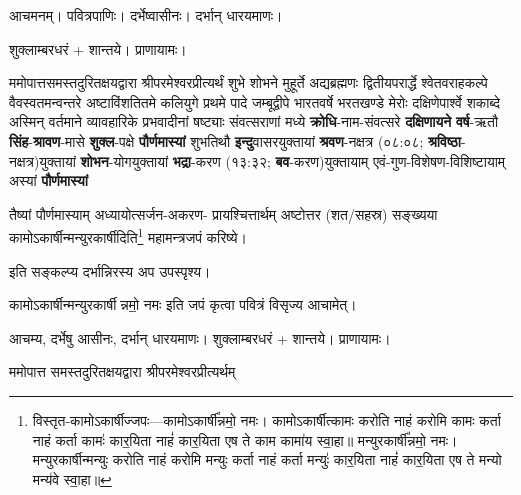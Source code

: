 
\setlength{\parindent}{0pt}

\newcommand{\sep}{\hspace{-0.5ex}{\small$\circ$}\hspace{0.5ex}}
\newcommand{\yutithyadi}{\textbf{क्रोधि}-नाम-संवत्सरे    \textbf{दक्षिणायने} \textbf{वर्ष}-ऋतौ   \textbf{सिंह}-\textbf{श्रावण}-मासे  \textbf{शुक्ल}-पक्षे    \textbf{पौर्णमास्यां} शुभतिथौ   \textbf{इन्दु}\-वासर\-युक्तायां \textbf{श्रवण}-नक्षत्र (०८:०८; \textbf{श्रविष्ठा}-नक्षत्र)\-युक्तायां   \textbf{शोभन}-योग\-युक्तायां    \textbf{भद्रा}-करण (१३:३२; \textbf{बव}-करण)\-युक्तायाम् एवं-गुण-विशेषण-विशिष्टायाम्     अस्यां \textbf{पौर्णमास्यां}}
\newcommand{\instruct}[2]{#1}
\begingroup


आचमनम्। पवित्रपाणिः। दर्भेष्वासीनः। दर्भान् धारयमाणः।

शुक्लाम्बरधरं + शान्तये। प्राणायामः।

ममोपात्तसमस्तदुरितक्षयद्वारा श्रीपरमेश्वरप्रीत्यर्थं शुभे शोभने मुहूर्ते अद्यब्रह्मणः
द्वितीयपरार्द्धे श्वेतवराहकल्पे वैवस्वतमन्वन्तरे अष्टाविंशतितमे कलियुगे प्रथमे पादे
जम्बूद्वीपे भारतवर्षे भरतखण्डे मेरोः दक्षिणेपार्श्वे शकाब्दे अस्मिन् वर्तमाने व्यावहारिके
 प्रभवादीनां षष्ट्याः संवत्सराणां मध्ये
\yutithyadi

तैष्यां पौर्णमास्याम् अध्यायोत्सर्जन-अकरण- प्रायश्चित्तार्थम् अष्टोत्तर (शत/सहस्र) सङ्ख्यया कामोऽकार्षीन्मन्युरकार्षीदिति\footnote{विस्तृत-कामोऽकार्षीज्जपः---कामोऽकार्\mbox{}षी᳚न्नमो॒ नमः। 
 कामोऽकार्\mbox{}षीत्कामः करोति नाहं करोमि कामः कर्ता नाहं कर्ता कामः॑ कार॒यिता नाहं॑ कार॒यिता एष ते काम कामा॑य स्वा॒हा॥ मन्युरकार्\mbox{}षी᳚न्नमो॒ नमः। 
मन्युरकार्\mbox{}षीन्मन्युः करोति नाहं करोमि मन्युः कर्ता नाहं कर्ता मन्युः॑ कार॒यिता नाहं॑ कार॒यिता एष ते मन्यो मन्य॑वे स्वा॒हा॥} महा\-मन्त्र\-जपं करिष्ये।

\instruct{इति सङ्कल्प्य दर्भान्निरस्य अप उपस्पृश्य।}{என்று ஸங்கல்பம் செய்து கொண்டு தர்பைகளை கீழே போட்டுவிட்டு ஜலத்தை தொடவும்.}

\instruct{कामोऽकार्षीन्मन्युरकार्षीन्नमो॒  नमः  इति जपं कृत्वा पवित्रं विसृज्य आचामेत्।}{காமோகார்ஷீத் மன்யுரகார்ஷீன்னமோ நம: என்று ஜபித்து முடிவில் ப்ராணாயாமம் செய்து உபஸ்தானம் செய்யவும். பவித்ரத்தை விஸர்ஜனம் செய்து ஆசமனம் செய்யவும்.}


आचम्य, दर्भेषु आसीनः, दर्भान् धारयमाणः। शुक्लाम्बरधरं + शान्तये। प्राणायामः।

ममोपात्त समस्तदुरितक्षयद्वारा श्रीपरमेश्वरप्रीत्यर्थम्

